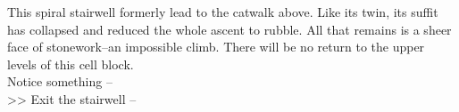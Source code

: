 This spiral stairwell formerly lead to the catwalk above. Like its twin, its suffit has collapsed and reduced the whole ascent to rubble. All that remains is a sheer face of stonework--an impossible climb. There will be no return to the upper levels of this cell block.\\

 Notice something -- \\
>> Exit the stairwell -- 